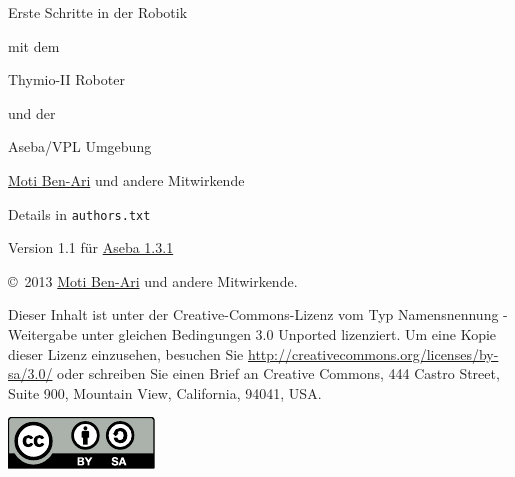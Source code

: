 \thispagestyle{empty}

\begin{center}
\begin{Huge}
\begin{bfseries}
Erste Schritte in der Robotik
\end{bfseries}

mit dem 

\begin{bfseries}
Thymio-II Roboter
\end{bfseries}

und der

\begin{bfseries}
Aseba/VPL Umgebung
\end{bfseries}

\end{Huge}

\vskip 2cm


\begin{LARGE}
\href{http://www.weizmann.ac.il/sci-tea/benari/}{Moti Ben-Ari} und andere Mitwirkende\\
\end{LARGE}
\bigskip
\begin{Large}
Details in \texttt{authors.txt} 
\end{Large}

\vskip 1cm

\begin{Large}
Version 1.1 für \href{https://aseba.wikidot.com/de:downloadinstall}{Aseba 1.3.1}
\end{Large}

\end{center}

\vfill

\begin{center}
\copyright{}\  2013 \href{http://www.weizmann.ac.il/sci-tea/benari/}{Moti Ben-Ari} und andere Mitwirkende.
\end{center}

Dieser Inhalt ist unter der Creative-Commons-Lizenz vom Typ Namensnennung -
Weitergabe unter gleichen Bedingungen 3.0 Unported lizenziert.
Um eine Kopie dieser Lizenz einzusehen, besuchen Sie \url{http://creativecommons.org/licenses/by-sa/3.0/} oder schreiben Sie einen Brief an Creative Commons, 444 Castro Street, Suite 900, Mountain View, California, 94041, USA.

\begin{center}
\includegraphics[width=.2\textwidth]{../images/by-sa}
\end{center}

